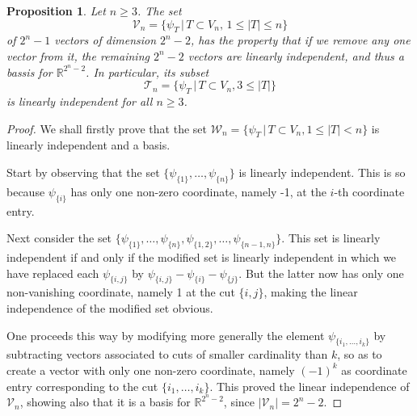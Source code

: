 \documentclass[12pt]{amsart}
\numberwithin{theorem}{section}
\newtheorem{proposition}[theorem]{Proposition}
\theoremstyle{remark}
\begin{document}
\begin{proposition} \label{Proposition showing linear independence of alternating sum vectors}
Let $n\ge 3$. The set 
$$\mathcal V_n = \{\psi_T\,|\, T\subset V_n, \, 1\le |T|\le n\}$$
of $2^n-1$ vectors of dimension $2^n-2$, has the property that if we remove any one vector from it, the remaining $2^n-2$ vectors are linearly independent, and thus a bassis for $\mathbb R^{2^n-2}$. In particular, its subset 
$$\mathcal T_n = \{\psi_T\,|\, T\subset V_n, 3\le|T|\}$$
is linearly independent for all $n\ge 3$. 
\end{proposition}
\begin{proof}
We shall firstly prove that the set $\mathcal W_n = \{\psi_T\,|\, T\subset V_n, 1\le |T|<n\}$ is linearly independent and a basis. %

Start by observing that the set $\{\psi_{\{1\}}, \dots, \psi_{\{n\}}\}$ is linearly independent. This is so because $\psi_{\{i\}}$ has only one non-zero coordinate, namely -1, at the $i$-th coordinate entry.  

Next consider the set $\{\psi_{\{1\}}, \dots, \psi_{\{n\}}, \psi_{\{1,2\}}, \dots, \psi_{\{n-1,n\}}\}$. This set is linearly independent if and only if the modified set is linearly independent in which we have replaced each $\psi_{\{i,j\}}$ by $\psi_{\{i,j\}} - \psi_{\{i\}}-\psi_{\{j\}}$. But the latter now has only one non-vanishing coordinate, namely 1 at the cut $\{i,j\}$, making the linear independence of the modified set obvious. 

One proceeds this way by modifying more generally the element $\psi_{\{i_1,\dots, i_k\}}$ by subtracting vectors associated to cuts of smaller cardinality than $k$, so as to create a vector with only one non-zero coordinate, namely $(-1)^k$ as coordinate entry corresponding to the cut $\{i_1,\dots, i_k\}$. This proved the linear independence of $\mathcal V_n$, showing also that it is a basis for $\mathbb R^{2^n-2}$, since $|\mathcal V_n| = 2^n-2$. 


\end{proof}
\end{document}
